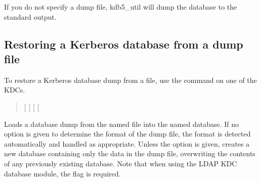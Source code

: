 \documentclass[letterpaper,10pt,english]{sphinxmanual}
\begin{document}
If you do not specify a dump file, kdb5\_util will dump the database to
the standard output.


\subsection{Restoring a Kerberos database from a dump file}
\label{\detokenize{admin/database:restore-from-dump}}\label{\detokenize{admin/database:restoring-a-kerberos-database-from-a-dump-file}}
To restore a Kerberos database dump from a file, use the
{\hyperref[\detokenize{admin/admin_commands/kdb5_util:kdb5-util-8}]{}}  command on one of the KDCs.
\begin{quote}

 {[}\textbar{}\textbar{}\sphinxstylestrong{-r18}{]} {[}\sphinxstylestrong{-hash}{]}
{[}\sphinxstylestrong{-verbose}{]} {[}\sphinxstylestrong{-update}{]} 
\end{quote}

Loads a database dump from the named file into the named database.  If
no option is given to determine the format of the dump file, the
format is detected automatically and handled as appropriate.  Unless
the  option is given,  creates a new database
containing only the data in the dump file, overwriting the contents of
any previously existing database.  Note that when using the LDAP KDC
database module, the  flag is required.
\end{document}
